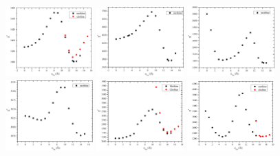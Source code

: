 \begin{figure}[htbp]
  \centering
  \includegraphics[width=0.3\textwidth]{figures/Tat/SDP_Results/X2/DOPC_Tat_62to1_3p0_X2} 
  \includegraphics[width=0.3\textwidth]{figures/Tat/SDP_Results/X2/DOPC_Tat_28to1_3p0_X2} 
  \includegraphics[width=0.3\textwidth]{figures/Tat/SDP_Results/X2/DOPC_Tat_16to1_3p0_X2}
  \includegraphics[width=0.3\textwidth]{figures/Tat/SDP_Results/X2/DOPCDOPE3to1_Tat_62to1_3p0_X2}
  \includegraphics[width=0.3\textwidth]{figures/Tat/SDP_Results/X2/DOPCDOPE3to1_Tat_28to1_3p0_X2}
  \includegraphics[width=0.3\textwidth]{figures/Tat/SDP_Results/X2/DOPCDOPE3to1_Tat_16to1_3p0_X2}

\end{figure}
